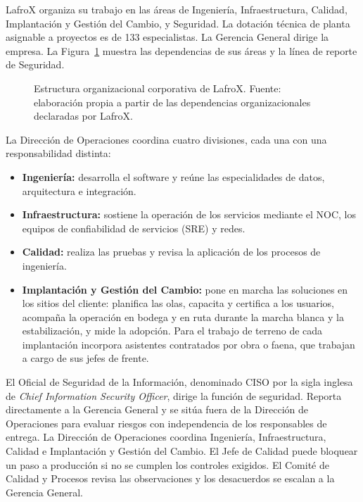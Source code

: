 LafroX organiza su trabajo en las áreas de Ingeniería, Infraestructura, Calidad, Implantación y Gestión del Cambio, y Seguridad. La dotación técnica de planta asignable a proyectos es de 133 especialistas. La Gerencia General dirige la empresa. La Figura~\ref{fig:organigrama} muestra las dependencias de sus áreas y la línea de reporte de Seguridad.

\begin{figure}[H]
\centering

\caption[Estructura organizacional corporativa de LafroX.]{Estructura organizacional corporativa de LafroX. Fuente: elaboración propia a partir de las dependencias organizacionales declaradas por LafroX.}
\label{fig:organigrama}
\end{figure}

La Dirección de Operaciones coordina cuatro divisiones, cada una con una responsabilidad distinta:
\begin{itemize}
    \item \textbf{Ingeniería:} desarrolla el software y reúne las especialidades de datos, arquitectura e integración.
    \item \textbf{Infraestructura:} sostiene la operación de los servicios mediante el NOC, los equipos de confiabilidad de servicios (SRE) y redes.
    \item \textbf{Calidad:} realiza las pruebas y revisa la aplicación de los procesos de ingeniería.
    \item \textbf{Implantación y Gestión del Cambio:} pone en marcha las soluciones en los sitios del cliente: planifica las olas, capacita y certifica a los usuarios, acompaña la operación en bodega y en ruta durante la marcha blanca y la estabilización, y mide la adopción. Para el trabajo de terreno de cada implantación incorpora asistentes contratados por obra o faena, que trabajan a cargo de sus jefes de frente.
\end{itemize}

El Oficial de Seguridad de la Información, denominado CISO por la sigla inglesa de \textit{Chief Information Security Officer}, dirige la función de seguridad. Reporta directamente a la Gerencia General y se sitúa fuera de la Dirección de Operaciones para evaluar riesgos con independencia de los responsables de entrega. La Dirección de Operaciones coordina Ingeniería, Infraestructura, Calidad e Implantación y Gestión del Cambio. El Jefe de Calidad puede bloquear un paso a producción si no se cumplen los controles exigidos. El Comité de Calidad y Procesos revisa las observaciones y los desacuerdos se escalan a la Gerencia General.

